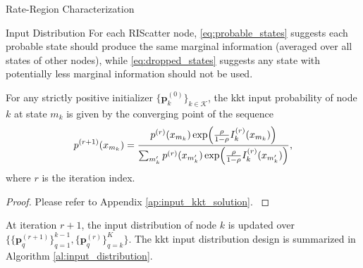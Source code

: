 \begin{section}{Rate-Region Characterization}
\begin{subsection}{Input Distribution}
		For each RIScatter node, \eqref{eq:probable_states} suggests each probable state should produce the same marginal information (averaged over all states of other nodes), while \eqref{eq:dropped_states} suggests any state with potentially less marginal information should not be used.
		\begin{proposition}
			For any strictly positive initializer $\{\mathbf{p}_k^{(0)}\}_{k \in \mathcal{K}}$, the \gls{kkt} input probability of node $k$ at state $m_k$ is given by the converging point of the sequence
			\begin{equation}
				p^{(r+1)}(x_{m_k}) = \frac{p^{(r)}(x_{m_k}) \exp \Bigl( \frac{\rho}{1 - \rho} I_k^{(r)}(x_{m_k}) \Bigr)}{\sum_{m_k'} p^{(r)}(x_{m_k'}) \exp \Bigl( \frac{\rho}{1 - \rho} I_k^{(r)}(x_{m_k'}) \Bigr)},
				\label{eq:input_kkt_solution}
			\end{equation}
			where $r$ is the iteration index.
			\label{pr:input_kkt_solution}
		\end{proposition}
		\begin{proof}
			Please refer to Appendix \ref{ap:input_kkt_solution}.
			\label{pf:input_kkt_solution}
		\end{proof}

		At iteration $r+1$, the input distribution of node $k$ is updated over $\bigl\{\{\mathbf{p}_q^{(r+1)}\}_{q=1}^{k-1},\{\mathbf{p}_q^{(r)}\}_{q=k}^{K}\bigr\}$.
		The \gls{kkt} input distribution design is summarized in Algorithm \ref{al:input_distribution}.


\end{subsection}
\end{section}
